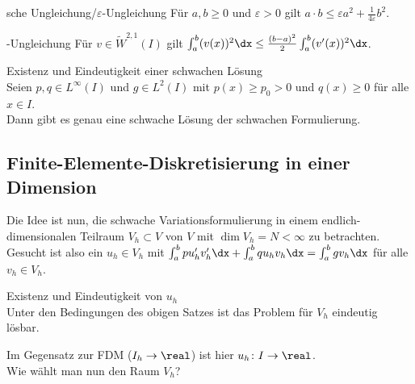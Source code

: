 \linie

\begin{Lemma}{sche Ungleichung/$\varepsilon$-Ungleichung}
    Für $a, b \ge 0$ und $\varepsilon > 0$ gilt
    $a \cdot b \le \varepsilon a^2 + \frac{1}{4\varepsilon} b^2$.
\end{Lemma}

\begin{Lemma}{-Ungleichung}
    Für $v \in \widetilde{W}^{2,1}(I)$ gilt
    $\int_a^b (v(x))^2 \dx \le \frac{(b - a)^2}{2} \int_a^b (v'(x))^2 \dx$.
\end{Lemma}

\begin{Satz}{Existenz und Eindeutigkeit einer schwachen Lösung}\\
    Seien $p, q \in L^\infty(I)$ und $g \in L^2(I)$ mit
    $p(x) \ge p_0 > 0$ und $q(x) \ge 0$ für alle $x \in I$.\\
    Dann gibt es genau eine schwache Lösung der schwachen Formulierung.
\end{Satz}

\subsection{%
    Finite-Elemente-Diskretisierung in einer Dimension%
}

\begin{Bem}
    Die Idee ist nun, die schwache Variationsformulierung in einem
    endlich-dimensiona\-len Teilraum $V_h \subset V$ von $V$ mit
    $\dim V_h = N < \infty$ zu betrachten.\\
    Gesucht ist also ein $u_h \in V_h$ mit
    $\int_a^b pu_h'v_h'\dx + \int_a^b qu_hv_h\dx = \int_a^b gv_h\dx$
    für alle $v_h \in V_h$.
\end{Bem}

\begin{Satz}{Existenz und Eindeutigkeit von $u_h$}\\
    Unter den Bedingungen des obigen Satzes ist das Problem für $V_h$
    eindeutig lösbar.
\end{Satz}

\begin{Bem}
    Im Gegensatz zur FDM ($I_h \rightarrow \real$) ist hier
    $u_h\colon I \rightarrow \real$.\\
    Wie wählt man nun den Raum $V_h$?
\end{Bem}

\linie


